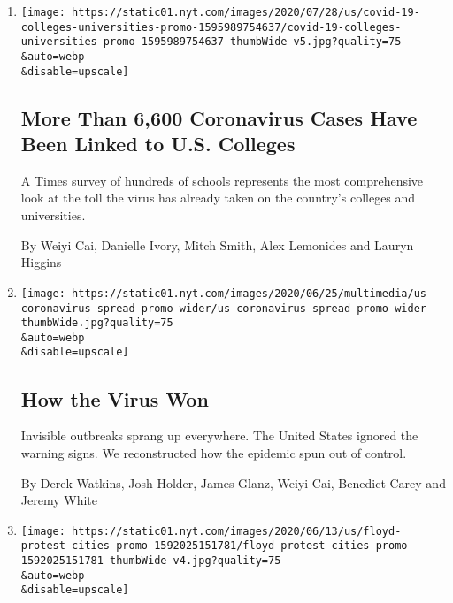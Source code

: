 \begin{enumerate}
\def\labelenumi{\arabic{enumi}.}
\item
  \href{/interactive/2020/07/28/us/covid-19-colleges-universities.html}{}

  \texttt{[image: https://static01.nyt.com/images/2020/07/28/us/covid-19-colleges-universities-promo-1595989754637/covid-19-colleges-universities-promo-1595989754637-thumbWide-v5.jpg?quality=75\\\&auto=webp\\\&disable=upscale]}

  \hypertarget{more-than-6600-coronavirus-cases-have-been-linked-to-us-colleges}{%
  \subsection{More Than 6,600 Coronavirus Cases Have Been Linked to U.S.
  Colleges}\label{more-than-6600-coronavirus-cases-have-been-linked-to-us-colleges}}

  A Times survey of hundreds of schools represents the most
  comprehensive look at the toll the virus has already taken on the
  country's colleges and universities.

  By Weiyi Cai, Danielle Ivory, Mitch Smith, Alex Lemonides and Lauryn
  Higgins
\item
  \href{/interactive/2020/us/coronavirus-spread.html}{}

  \texttt{[image: https://static01.nyt.com/images/2020/06/25/multimedia/us-coronavirus-spread-promo-wider/us-coronavirus-spread-promo-wider-thumbWide.jpg?quality=75\\\&auto=webp\\\&disable=upscale]}

  \hypertarget{how-the-virus-won}{%
  \subsection{How the Virus Won}\label{how-the-virus-won}}

  Invisible outbreaks sprang up everywhere. The United States ignored
  the warning signs. We reconstructed how the epidemic spun out of
  control.

  By Derek Watkins, Josh Holder, James Glanz, Weiyi Cai, Benedict Carey
  and Jeremy White
\item
  \href{/interactive/2020/06/13/us/george-floyd-protests-cities-photos.html}{}

  \texttt{[image: https://static01.nyt.com/images/2020/06/13/us/floyd-protest-cities-promo-1592025151781/floyd-protest-cities-promo-1592025151781-thumbWide-v4.jpg?quality=75\\\&auto=webp\\\&disable=upscale]}


\end{enumerate}
